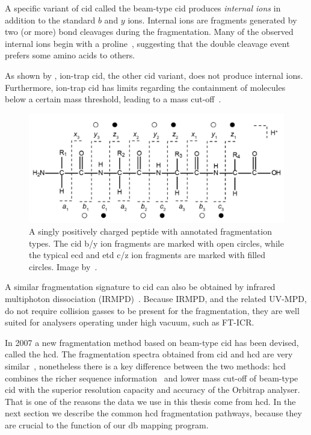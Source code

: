 A specific variant of \gls*{cid} called the beam-type \gls*{cid} produces \emph{internal ions} in addition to the standard \(b\) and \(y\) ions. Internal ions are fragments generated by two (or more) bond cleavages during the fragmentation. Many of the observed internal ions begin with a proline~\cite{michalski2012systematic}, suggesting that the double cleavage event prefers some amino acids to others.

As shown by \citet{michalski2012systematic}, ion-trap \gls*{cid}, the other \gls*{cid} variant, does not produce internal ions. Furthermore, ion-trap \gls*{cid} has limits regarding the containment of molecules below a certain mass threshold, leading to a mass cut-off~\cite{louris1987instrumentation}.

\begin{figure}
  \centering
  \includegraphics[width=.75\linewidth]{img/fragment-types.png}
  \caption{A singly positively charged peptide with annotated fragmentation types. The \gls*{cid} b/y ion fragments are marked with open circles, while the typical \gls*{ecd} and \gls*{etd} c/z ion fragments are marked with filled circles. Image by~\citet{hart2014review}.}\label{fig:fragment-types}
\end{figure}

A similar fragmentation signature to \gls*{cid} can also be obtained by infrared multiphoton dissociation (IRMPD)~\cite{oomens2006gas}. Because IRMPD, and the related UV-MPD, do not require collision gasses to be present for the fragmentation, they are well suited for analysers operating under high vacuum, such as FT-ICR\@.

In 2007 a new fragmentation method based on beam-type \gls*{cid} has been devised, called the \gls*{hcd}\@. The fragmentation spectra obtained from \gls*{cid} and \gls*{hcd} are very similar~\cite{michalski2012systematic}, nonetheless there is a key difference between the two methods: \gls*{hcd} combines the richer sequence information~\cite{xia2006ion} and lower mass cut-off of beam-type \gls*{cid} with the superior resolution capacity and accuracy of the Orbitrap analyser. That is one of the reasons the data we use in this thesis come from \gls*{hcd}\@. In the next section we describe the common \gls*{hcd} fragmentation pathways, because they are crucial to the function of our \gls*{db} mapping program.

